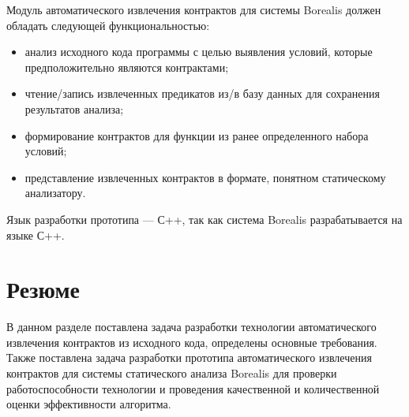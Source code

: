 Модуль автоматического извлечения контрактов для системы Borealis должен обладать следующей функциональностью:
\begin{itemize}
\item анализ исходного кода программы с целью выявления условий, которые предположительно являются контрактами;
\item чтение/запись извлеченных предикатов из/в базу данных для сохранения результатов анализа;
\item формирование контрактов для функции из ранее определенного набора условий;
\item представление извлеченных контрактов в формате, понятном статическому анализатору.
\end{itemize}
Язык разработки прототипа --- С++\cite{languageC++}, так как система Borealis разрабатывается на языке С++.

\section{Резюме}
В данном разделе поставлена задача разработки технологии автоматического извлечения контрактов из исходного кода, определены основные требования. Также поставлена задача разработки прототипа автоматического извлечения контрактов для системы статического анализа Borealis для проверки работоспособности технологии и проведения качественной и количественной оценки эффективности алгоритма. 
